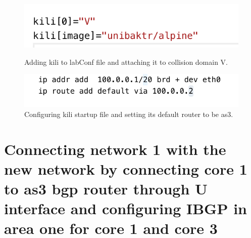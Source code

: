 \begin{figure}[H]
  \centering
  \begin{minipage}[b]{0.45\textwidth}
    \includegraphics[width=\textwidth]{Images/kiliConf.png}
    \caption{Adding kili to labConf file and attaching it to collision domain V.}
  \end{minipage}
  \hfill
  \begin{minipage}[b]{0.45\textwidth}
    \includegraphics[width=\textwidth]{Images/kiliStartUp.png}
    \caption{Configuring kili startup file and setting its default router to be as3.}
  \end{minipage}
\end{figure}

\section{Connecting network 1 with the new network by connecting core 1 to as3 bgp router through U interface and configuring IBGP in area one for core 1 and core 3}

